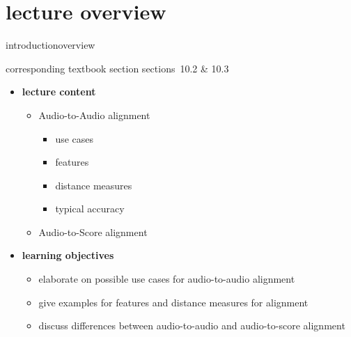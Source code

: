 


\subtitle{Module 10.2: Audio-to-Audio \& Audio-to-Score Alignment}


	

    \section[overview]{lecture overview}
        \begin{frame}{introduction}{overview}
            \begin{block}{corresponding textbook section}
                    sections~10.2 \& 10.3
            \end{block}

            \begin{itemize}
                \item   \textbf{lecture content}
                    \begin{itemize}
                        \item   Audio-to-Audio alignment
                            \begin{itemize}
                                \item   use cases
                                \item   features
                                \item   distance measures
                                \item   typical accuracy
                            \end{itemize}
                        \item   Audio-to-Score alignment
                    \end{itemize}
                \bigskip
                \item<2->   \textbf{learning objectives}
                    \begin{itemize}
                        \item   elaborate on possible use cases for audio-to-audio alignment
                        \item   give examples for features and distance measures for alignment
                        \item   discuss differences between audio-to-audio and audio-to-score alignment
                    \end{itemize}
            \end{itemize}
        \end{frame}

